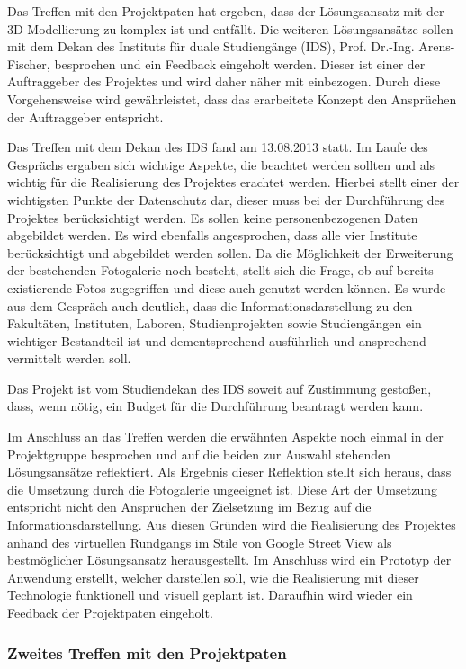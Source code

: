 Das Treffen mit den Projektpaten hat ergeben, dass der Lösungsansatz mit der 3D-Modellierung zu komplex ist und entfällt.
Die weiteren Lösungsansätze sollen mit dem Dekan des Instituts für duale Studiengänge (IDS), 
Prof. Dr.-Ing. Arens-Fischer, besprochen und ein Feedback 
eingeholt werden. Dieser ist einer der Auftraggeber des Projektes und wird daher näher mit einbezogen. Durch diese 
Vorgehensweise wird gewährleistet, dass das erarbeitete Konzept den Ansprüchen der Auftraggeber entspricht.

Das Treffen mit dem Dekan des IDS fand am 13.08.2013 statt.
Im Laufe des Gesprächs ergaben sich wichtige Aspekte, die beachtet werden sollten und als wichtig für die Realisierung 
des Projektes erachtet werden. Hierbei stellt einer der wichtigsten Punkte der Datenschutz dar, dieser muss bei der 
Durchführung des Projektes berücksichtigt werden. Es sollen keine personenbezogenen Daten abgebildet werden.
Es wird ebenfalls angesprochen, dass alle vier Institute berücksichtigt und abgebildet werden sollen. Da die Möglichkeit 
der Erweiterung der bestehenden Fotogalerie noch besteht, stellt sich die Frage, ob auf bereits existierende Fotos 
zugegriffen und diese auch genutzt werden können. 
Es wurde aus dem Gespräch auch deutlich, dass die Informationsdarstellung zu den Fakultäten, Instituten, Laboren, 
Studienprojekten sowie Studiengängen ein wichtiger Bestandteil ist und dementsprechend ausführlich und ansprechend 
vermittelt werden soll.

Das Projekt ist vom Studiendekan des IDS soweit auf Zustimmung gestoßen, dass, wenn nötig, ein Budget für die 
Durchführung beantragt werden kann.

Im Anschluss an das Treffen werden die erwähnten Aspekte noch einmal in der Projektgruppe besprochen und auf die beiden 
zur Auswahl stehenden Lösungsansätze reflektiert. Als Ergebnis dieser Reflektion stellt sich heraus, dass die Umsetzung 
durch die Fotogalerie ungeeignet ist. Diese Art der Umsetzung entspricht nicht den Ansprüchen der Zielsetzung im Bezug 
auf die Informationsdarstellung.
Aus diesen Gründen wird die Realisierung des Projektes anhand des virtuellen Rundgangs im Stile von Google Street View 
als bestmöglicher Lösungsansatz herausgestellt. Im Anschluss wird ein Prototyp der Anwendung erstellt, welcher darstellen 
soll, wie die Realisierung mit dieser Technologie funktionell und visuell geplant ist. Daraufhin wird wieder ein Feedback 
der Projektpaten eingeholt.

\subsubsection*{Zweites Treffen mit den Projektpaten}
\label{sec:Treffen3}


